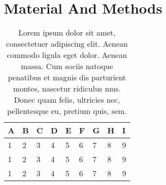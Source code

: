 
\section{Material And Methods}



\lipsum[1]



\begin{table}[H] %
	\centering
	\label{tab:test_table_one}
	\caption{Lorem ipsum dolor sit amet, consectetuer adipiscing elit. Aenean
	 commodo ligula eget dolor. Aenean massa. Cum sociis natoque penatibus et magnis
	 dis parturient montes, nascetur ridiculus mus. Donec quam felis, ultricies nec,
	 pellentesque eu, pretium quis, sem.}
	   {\small
			\begin{tabular}{p{}p{}p{}p{}p{}p{}p{}p{}p{}}
				\toprule
					A & B & C & D & E & F & G & H & I\\ 
				\midrule
					1 & 2 & 3 & 4 & 5 & 6 & 7 & 8 & 9\\ 
					1 & 2 & 3 & 4 & 5 & 6 & 7 & 8 & 9\\ 
					1 & 2 & 3 & 4 & 5 & 6 & 7 & 8 & 9\\ 
				\bottomrule
			\end{tabular}
		}
\end{table} %


\lipsum[1]
